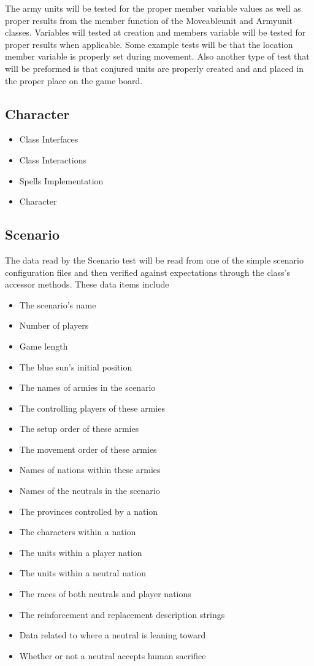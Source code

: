 {\color{black}

The army units will be tested for the proper member variable values as well as proper results from the member function of the Moveableunit and Armyunit classes. Variables will tested at creation and members variable will be tested for proper results when applicable. Some example tests will be that the location member variable is properly set during movement. Also another type of test that will be preformed is that conjured units are properly created and and placed in the proper place on the game board. 
}

{\color{black}
\subsection{Character}
\begin{itemize}
\item Class Interfaces
\item Class Interactions
\item Spells Implementation
\item Character 
\end{itemize}

\subsection{Scenario}
The data read by the Scenario test will be read from one of the simple 
scenario configuration files and then verified against expectations through 
the class's accessor methods. These data items include 
\newline
\begin{itemize}
\item The scenario's name
\item Number of players
\item Game length
\item The blue sun's initial position
\item The names of armies in the scenario
\item The controlling players of these armies
\item The setup order of these armies
\item The movement order of these armies
\item Names of nations within these armies
\item Names of the neutrals in the scenario
\item The provinces controlled by a nation
\item The characters within a nation
\item The units within a player nation
\item The units within a neutral nation
\item The races of both neutrals and player nations
\item The reinforcement and replacement description strings
\item Data related to where a neutral is leaning toward
\item Whether or not a neutral accepts human sacrifice
\end{itemize}

}
